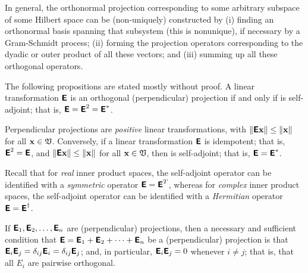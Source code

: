 In general, the orthonormal projection corresponding to some arbitrary subspace of some Hilbert space can be (non-uniquely)
constructed by
(i) finding an orthonormal basis spanning that subsystem (this is nonunique),
if necessary by a Gram-Schmidt process;
(ii) forming the projection operators corresponding to the dyadic or outer product
of all these vectors; and
(iii) summing up all these orthogonal operators.


The following propositions are stated mostly without proof.
A  linear transformation $\textsf{\textbf{E}}$ is an orthogonal (perpendicular) projection
if and only if is self-adjoint; that is,
$\textsf{\textbf{E}} = \textsf{\textbf{E}}^2=\textsf{\textbf{E}}^\ast $.

Perpendicular projections are {\em positive} linear transformations,
with
$\left\| \textsf{\textbf{E}}{\bf x} \right\| \le \| {\bf x} \|$
for all
${\bf x} \in {\frak V}$.
Conversely,
if a linear transformation $\textsf{\textbf{E}}$
is idempotent; that is,
$\textsf{\textbf{E}}^2=\textsf{\textbf{E}}$,
and  $\left\| \textsf{\textbf{E}}{\bf x} \right\| \le \| {\bf x} \|$
for all
${\bf x} \in {\frak V}$,
then  is self-adjoint; that is,
$\textsf{\textbf{E}}=\textsf{\textbf{E}}^\ast$.

Recall that
for {\em real} inner product spaces, the self-adjoint operator can be identified with a {\em symmetric} operator
$\textsf{\textbf{E}}=\textsf{\textbf{E}}^T$,
whereas
for {\em complex} inner product spaces, the self-adjoint operator can be identified with a {\em Hermitian} operator
$\textsf{\textbf{E}}=\textsf{\textbf{E}}^\dagger$.


If $\textsf{\textbf{E}}_1,\textsf{\textbf{E}}_2, \ldots , \textsf{\textbf{E}}_n$ are (perpendicular)
projections,
then a necessary and sufficient condition that
$\textsf{\textbf{E}} =\textsf{\textbf{E}}_1+\textsf{\textbf{E}}_2+\cdots +\textsf{\textbf{E}}_n$
be a (perpendicular) projection is that
 $\textsf{\textbf{E}}_i \textsf{\textbf{E}}_j =\delta_{ij}\textsf{\textbf{E}}_i =\delta_{ij}\textsf{\textbf{E}}_j$;
and, in particular,
$\textsf{\textbf{E}}_i \textsf{\textbf{E}}_j =0$
whenever $i\neq j$; that is, that all $E_i$ are pairwise orthogonal.

